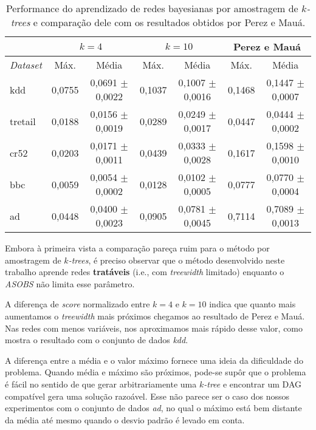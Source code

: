 \begin{table}[h]
  \centering

  {\footnotesize
    \begin{tabular}{l c c c c c c} \hline
      & \multicolumn{2}{c}{$k = 4$} & \multicolumn{2}{c}{$k = 10$} & \multicolumn{2}{c}{Perez e Mauá} \\ \hline
      \emph{Dataset} & Máx. & Média & Máx. & Média & Máx. & Média \\ \hline
      kdd & 0,0755 & 0,0691 $\pm$ 0,0022 & 0,1037 & 0,1007 $\pm$ 0,0016 & 0,1468 & 0,1447 $\pm$ 0,0007 \\
      tretail & 0,0188 & 0,0156 $\pm$ 0,0019 & 0,0289 & 0,0249 $\pm$ 0,0017 & 0,0447 & 0,0444 $\pm$ 0,0002 \\
      cr52 & 0,0203 & 0,0171 $\pm$ 0,0011 & 0,0439 & 0,0333 $\pm$ 0,0028 & 0,1617 & 0,1598 $\pm$ 0,0010 \\
      bbc & 0,0059 & 0,0054 $\pm$ 0,0002 & 0,0128 & 0,0102 $\pm$ 0,0005 & 0,0777 & 0,0770 $\pm$ 0,0004 \\
      ad & 0,0448 & 0,0400 $\pm$ 0,0023 & 0,0905 & 0,0781 $\pm$ 0,0045 & 0,7114 & 0,7089 $\pm$ 0,0013 \\ \hline
    \end{tabular}
  }

  \caption{Performance do aprendizado de redes bayesianas por amostragem de \emph{$k$-trees} e comparação dele com os resultados obtidos por Perez e Mauá.}
  \label{tab:comparacao}
\end{table}

Embora à primeira vista a comparação pareça ruim para o método por amostragem de \emph{$k$-trees}, é preciso observar que o método desenvolvido neste trabalho aprende redes \textbf{tratáveis} (i.e., com \emph{treewidth} limitado) enquanto o \emph{ASOBS} não limita esse parâmetro.

A diferença de \emph{score} normalizado entre $k = 4$ e $k = 10$ indica que quanto mais aumentamos o \emph{treewidth} mais próximos chegamos ao resultado de Perez e Mauá. Nas redes com menos variáveis, nos aproximamos mais rápido desse valor, como mostra o resultado com o conjunto de dados \emph{kdd}.

A diferença entre a média e o valor máximo fornece uma ideia da dificuldade do problema. Quando média e máximo são próximos, pode-se supôr que o problema é fácil no sentido de que gerar arbitrariamente uma \emph{$k$-tree} e encontrar um DAG compatível gera uma solução razoável. Esse não parece ser o caso dos nossos experimentos com o conjunto de dados \emph{ad}, no qual o máximo está bem distante da média até mesmo quando o desvio padrão é levado em conta.
